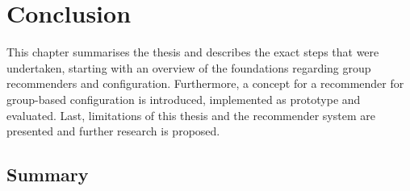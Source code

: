 \chapter{Conclusion}
\label{ch:Conclusion}

This chapter summarises the thesis and describes the exact steps that were undertaken, starting with an overview of the foundations regarding group recommenders and configuration. Furthermore, a concept for a recommender for group-based configuration is introduced, implemented as prototype and evaluated. Last, limitations of this thesis and the recommender system are presented and further research is proposed.

\section{Summary}
\label{sec:Conclusion:Summary}

